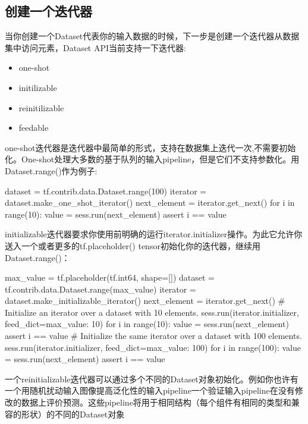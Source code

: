 \subsection{创建一个迭代器}
当你创建一个Dataset代表你的输入数据的时候，下一步是创建一个迭代器从数据集中访问元素，Dataset API当前支持一下迭代器:
\begin{itemize}
	\item one-shot
	\item initilizable
	\item reinitilizable
	\item feedable
\end{itemize}
one-shot迭代器是迭代器中最简单的形式，支持在数据集上迭代一次,不需要初始化。One-shot处理大多数的基于队列的输入pipeline，但是它们不支持参数化。用Dataset.range()作为例子:
\begin{python}
dataset = tf.contrib.data.Dataset.range(100)
iterator = dataset.make_one_shot_iterator()
next_element = iterator.get_next()
for i in range(10):
    value = sess.run(next_element)
    assert i == value
\end{python}
initializable迭代器要求你使用前明确的运行iterator.initializer操作。为此它允许你送入一个或者更多的tf.placeholder() tensor初始化你的迭代器，继续用Dataset.range()：
\begin{python}
max_value = tf.placeholder(tf.int64, shape=[])
dataset = tf.contrib.data.Dataset.range(max_value)
iterator = dataset.make_initializable_iterator()
next_element = iterator.get_next()
# Initialize an iterator over a dataset with 10 elements.
sess.run(iterator.initializer, feed_dict={max_value: 10})
for i in range(10):
    value = sess.run(next_element)
    assert i == value
# Initialize the same iterator over a dataset with 100 elements.
sess.run(iterator.initializer, feed_dict={max_value: 100})
for i in range(100):
    value = sess.run(next_element)
    assert i == value
\end{python}
一个reinitializable迭代器可以通过多个不同的Dataset对象初始化。例如你也许有一个用随机扰动输入图像提高泛化性的输入pipeline一个验证输入pipeline在没有修改的数据上评价预测。这些pipeline将用于相同结构（每个组件有相同的类型和兼容的形状）的不同的Dataset对象
